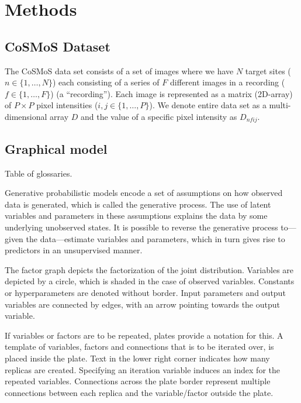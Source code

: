 \section{Methods}

\subsection{CoSMoS Dataset}

The CoSMoS data set consists of a set of images where we have $N$ target sites ($n \in \{1,\dots,N\}$) each consisting of a series of $F$ different images in a recording ($f \in \{1,\dots,F\}$) (a “recording”). Each image is represented as a matrix (2D-array) of $P \times P$ pixel intensities ($i,j \in \{1,\dots,P\}$). We denote entire data set as a multi-dimensional array $D$ and the value of a specific pixel intensity as $D_{nfij}$.

\subsection{Graphical model}

Table of glossaries.

Generative probabilistic models encode a set of assumptions on how observed data is generated, which is called the generative process. The use of latent variables and parameters in these assumptions explains the data by some underlying unobserved states. It is possible to reverse the generative process to—given the data—estimate variables and parameters, which in turn gives rise to predictors in an unsupervised manner.

The factor graph depicts the factorization of the joint distribution. Variables are depicted by a circle, which is shaded in the case of observed variables. Constants or hyperparameters are denoted without border. Input parameters and output variables are connected by edges, with an arrow pointing towards the output variable.

If variables or factors are to be repeated, plates provide a notation for this. A template of variables, factors and connections that is to be iterated over, is placed inside the plate. Text in the lower right corner indicates how many replicas are created. Specifying an iteration variable induces an index for the repeated variables. Connections across the plate border represent multiple connections between each replica and the variable/factor outside the plate.

